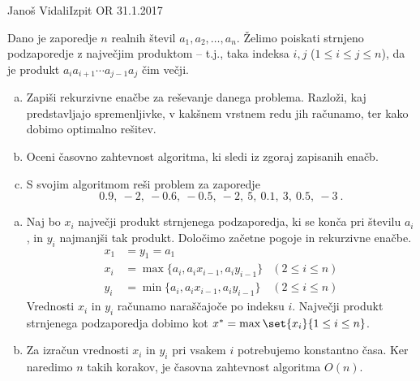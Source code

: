 \begin{naloga}{Janoš Vidali}{Izpit OR 31.1.2017}
\begin{vprasanje}
Dano je zaporedje $n$ realnih števil $a_1, a_2, \dots, a_n$.
Želimo poiskati strnjeno podzaporedje z največjim produktom
-- t.j., taka indeksa $i, j$ ($1 \le i \le j \le n$),
da je produkt $a_i a_{i+1} \cdots a_{j-1} a_j$ čim večji.

\begin{enumerate}[(a)]
\item Zapiši rekurzivne enačbe za reševanje danega problema.
Razloži, kaj pred\-stav\-lja\-jo spremenljivke,
v kakšnem vrstnem redu jih računamo,
ter kako dobimo optimalno rešitev.

\item Oceni časovno zahtevnost algoritma, ki sledi iz zgoraj zapisanih enačb.

\item S svojim algoritmom reši problem za zaporedje
$$
0.9, \ -2, \ -0.6, \ -0.5, \ -2, \ 5, \ 0.1, \ 3, \ 0.5, \ -3 \ .
$$
\end{enumerate}
\end{vprasanje}

\begin{odgovor}
\begin{enumerate}[(a)]
\item Naj bo $x_i$ največji produkt strnjenega podzaporedja,
ki se konča pri številu $a_i$,
in $y_i$ najmanjši tak produkt.
Določimo začetne pogoje in rekurzivne enačbe.
\begin{align*}
x_1 &= y_1 = a_1 \\
x_i &= \max\{a_i, a_i x_{i-1}, a_i y_{i-1}\} & (2 \le i \le n) \\
y_i &= \min\{a_i, a_i x_{i-1}, a_i y_{i-1}\} & (2 \le i \le n)
\end{align*}
Vrednosti $x_i$ in $y_i$ računamo naraščajoče po indeksu $i$.
Največji produkt strnjenega podzaporedja
dobimo kot $x^* = \max\set{x_i}{1 \le i \le n}$.

\item Za izračun vrednosti $x_i$ in $y_i$
pri vsakem $i$ potrebujemo konstantno časa.
Ker naredimo $n$ takih korakov, je časovna zahtevnost algoritma $O(n)$.


\end{enumerate}
\end{odgovor}
\end{naloga}
